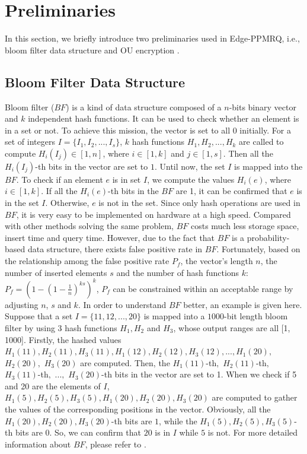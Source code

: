 \documentclass[IEEE JOURNAL OF BIOMEDICAL AND HEALTH INFORMATICS]{IEEEtran}
\begin{document}
\section{Preliminaries}
In this section, we briefly introduce two preliminaries used in Edge-PPMRQ, i.e., bloom filter data structure \cite{bloomfilter1970} and OU encryption \cite{ou1998}.

\subsection{Bloom Filter Data Structure}
Bloom filter ($BF$) \cite{bloomfilter1970} is a kind of data structure composed of a $n$-bits binary vector and $k$ independent hash functions. It can be used to check whether an element is in a set or not. To achieve this mission, the vector is set to all $0$ initially. For a set of integers $I=\{I_1, I_2, ... ,I_s\}$, $k$ hash functions $H_1, H_2, ... , H_k$ are called to compute $H_i(I_j) \in [1, n]$, where $i\in [1, k]$ and $j\in[1, s]$. Then all the $H_i(I_j)$-th bits in the vector are set to $1$. Until now, the set $I$ is mapped into the $BF$. To check if an element $e$ is in set $I$, we compute the values $H_i(e)$, where $i\in[1, k]$. If all the $H_i(e)$-th bits in the $BF$ are 1, it can be confirmed that $e$ is in the set $I$. Otherwise, $e$ is not in the set. Since only hash operations are used in $BF$, it is very easy to be implemented on hardware at a high speed. Compared with other methods solving the same problem, $BF$ costs much less storage space, insert time and query time. However, due to the fact that $BF$ is a probability-based data structure, there exists false positive rate in $BF$. Fortunately, based on the relationship among the false positive rate $P_f$, the vector's length $n$, the number of inserted elements $s$ and the number of hash functions $k$: $P_f=(1-(1-\frac{1}{n})^{ks})^k$, $P_f$ can be constrained within an acceptable range by adjusting $n$, $s$ and $k$. In order to understand $BF$ better, an example is given here. Suppose that a set $I = \{11, 12, ..., 20 \}$ is mapped into a $1000$-bit length bloom filter by using 3 hash functions $H_1, H_2$ and $H_3$, whose output ranges are all [1, 1000]. Firstly, the hashed values $H_1(11), H_2(11), H_3(11), H_1(12), H_2(12), H_3(12), ... , H_1(20),$ $H_2(20),$ $H_3(20)$ are computed. Then, the $H_1(11)$-th$,$ $H_2(11)$-th$,$ $H_3(11)$-th$,$ $... ,$ $H_3(20)$-th bits in the vector are set to 1. When we check if 5 and 20 are the elements of $I$, $H_1(5), H_2(5), H_3(5), H_1(20), H_2(20), H_3(20)$ are computed to gather the values of the corresponding positions in the vector. Obviously, all the $H_1(20), H_2(20), H_3(20)$-th bits are $1$, while the $H_1(5), H_2(5), H_3(5)$-th bits are $0$. So, we can confirm that $20$ is in $I$ while $5$ is not. For more detailed information about $BF$, please refer to \cite{bloomfilter1970}.	
\end{document}

